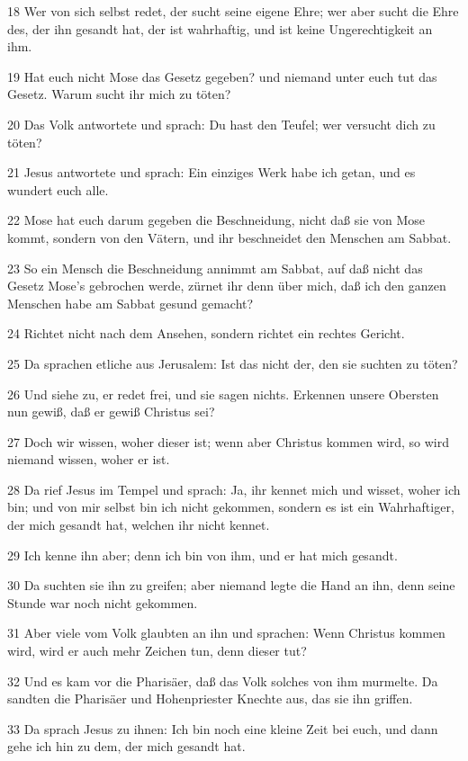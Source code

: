 \par 18 Wer von sich selbst redet, der sucht seine eigene Ehre; wer aber sucht die Ehre des, der ihn gesandt hat, der ist wahrhaftig, und ist keine Ungerechtigkeit an ihm.
\par 19 Hat euch nicht Mose das Gesetz gegeben? und niemand unter euch tut das Gesetz. Warum sucht ihr mich zu töten?
\par 20 Das Volk antwortete und sprach: Du hast den Teufel; wer versucht dich zu töten?
\par 21 Jesus antwortete und sprach: Ein einziges Werk habe ich getan, und es wundert euch alle.
\par 22 Mose hat euch darum gegeben die Beschneidung, nicht daß sie von Mose kommt, sondern von den Vätern, und ihr beschneidet den Menschen am Sabbat.
\par 23 So ein Mensch die Beschneidung annimmt am Sabbat, auf daß nicht das Gesetz Mose's gebrochen werde, zürnet ihr denn über mich, daß ich den ganzen Menschen habe am Sabbat gesund gemacht?
\par 24 Richtet nicht nach dem Ansehen, sondern richtet ein rechtes Gericht.
\par 25 Da sprachen etliche aus Jerusalem: Ist das nicht der, den sie suchten zu töten?
\par 26 Und siehe zu, er redet frei, und sie sagen nichts. Erkennen unsere Obersten nun gewiß, daß er gewiß Christus sei?
\par 27 Doch wir wissen, woher dieser ist; wenn aber Christus kommen wird, so wird niemand wissen, woher er ist.
\par 28 Da rief Jesus im Tempel und sprach: Ja, ihr kennet mich und wisset, woher ich bin; und von mir selbst bin ich nicht gekommen, sondern es ist ein Wahrhaftiger, der mich gesandt hat, welchen ihr nicht kennet.
\par 29 Ich kenne ihn aber; denn ich bin von ihm, und er hat mich gesandt.
\par 30 Da suchten sie ihn zu greifen; aber niemand legte die Hand an ihn, denn seine Stunde war noch nicht gekommen.
\par 31 Aber viele vom Volk glaubten an ihn und sprachen: Wenn Christus kommen wird, wird er auch mehr Zeichen tun, denn dieser tut?
\par 32 Und es kam vor die Pharisäer, daß das Volk solches von ihm murmelte. Da sandten die Pharisäer und Hohenpriester Knechte aus, das sie ihn griffen.
\par 33 Da sprach Jesus zu ihnen: Ich bin noch eine kleine Zeit bei euch, und dann gehe ich hin zu dem, der mich gesandt hat.
